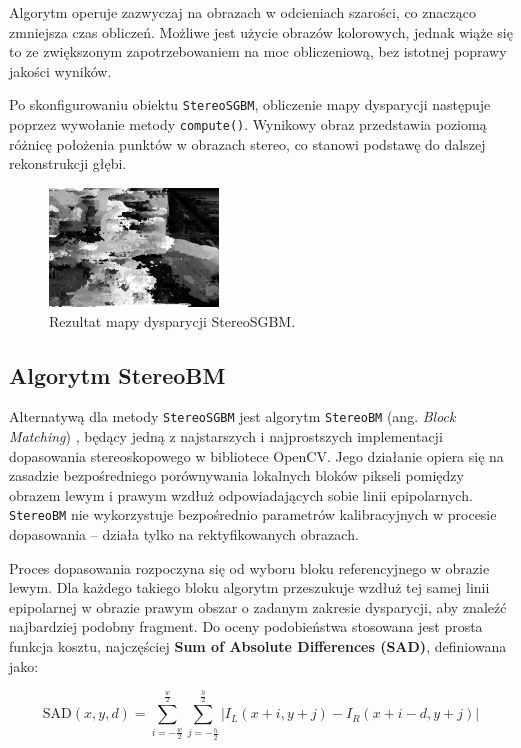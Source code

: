 \documentclass[magisterska]{pracadypl}
\begin{document}
Algorytm operuje zazwyczaj na obrazach w odcieniach szarości, co znacząco zmniejsza czas obliczeń. Możliwe jest użycie obrazów kolorowych, jednak wiąże się to ze zwiększonym zapotrzebowaniem na moc obliczeniową, bez istotnej poprawy jakości wyników.

Po skonfigurowaniu obiektu \texttt{StereoSGBM}, obliczenie mapy dysparycji następuje poprzez wywołanie metody \texttt{compute()}. Wynikowy obraz przedstawia poziomą różnicę położenia punktów w obrazach stereo, co stanowi podstawę do dalszej rekonstrukcji głębi.

\begin{figure}[H]
\centering
\includegraphics[width=0.4\textwidth]{images/disparity.png}
\captionsetup{font=footnotesize}
\caption[Rezultat mapy dysparycji StereoSGBM. Opracowanie własne.]{Rezultat mapy dysparycji StereoSGBM.}
\end{figure}
\subsection{Algorytm StereoBM}

Alternatywą dla metody \texttt{StereoSGBM} jest algorytm \texttt{StereoBM} (ang. \textit{Block Matching}) \cite{bm}, będący jedną z najstarszych i najprostszych implementacji dopasowania stereoskopowego w bibliotece OpenCV. Jego działanie opiera się na zasadzie bezpośredniego porównywania lokalnych bloków pikseli pomiędzy obrazem lewym i prawym wzdłuż odpowiadających sobie linii epipolarnych. \texttt{StereoBM} nie wykorzystuje bezpośrednio parametrów kalibracyjnych w procesie dopasowania – działa tylko na rektyfikowanych obrazach. 

Proces dopasowania rozpoczyna się od wyboru bloku referencyjnego w obrazie lewym. Dla każdego takiego bloku algorytm przeszukuje wzdłuż tej samej linii epipolarnej w obrazie prawym obszar o zadanym zakresie dysparycji, aby znaleźć najbardziej podobny fragment. Do oceny podobieństwa stosowana jest prosta funkcja kosztu, najczęściej \textbf{Sum of Absolute Differences (SAD)}, definiowana jako:

\[
\text{SAD}(x,y,d) = \sum_{i=-\frac{w}{2}}^{\frac{w}{2}} \sum_{j=-\frac{h}{2}}^{\frac{h}{2}} | I_L(x+i,y+j) - I_R(x+i-d,y+j) |
\]
\end{document}
